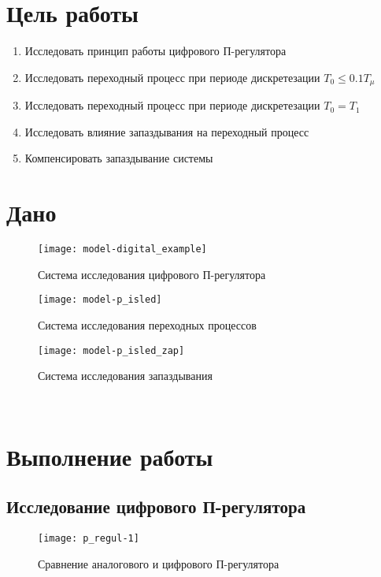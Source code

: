 


    


    \section{Цель работы}
    \begin{enumerate}
        \item Исследовать принцип работы цифрового П-регулятора
        \item Исследовать переходный процесс при периоде дискретезации $T_0\leq0.1T_\mu$
        \item Исследовать переходный процесс при периоде дискретезации $T_0=T_1$
        \item Исследовать влияние запаздывания на переходный процесс
        \item Компенсировать запаздывание системы
    \end{enumerate}


    \section{Дано}
    \begin{figure}[H]
        \centering\texttt{[image: model-digital\_example]}
        \caption{Система исследования цифрового П-регулятора}
    \end{figure}
    \begin{figure}[H]
        \centering\texttt{[image: model-p\_isled]}
        \caption{Система исследования переходных процессов}
    \end{figure}
    \begin{figure}[H]
        \centering\texttt{[image: model-p\_isled\_zap]}
        \caption{Система исследования запаздывания}
    \end{figure}

    \begin{center}
        \noindent{}\\
    \end{center}


    \section{Выполнение работы}

    \subsection{Исследование цифрового П-регулятора}
    \begin{figure}[H]
        \centering\texttt{[image: p\_regul-1]}
        \caption{Сравнение аналогового и цифрового П-регулятора}
    \end{figure}

